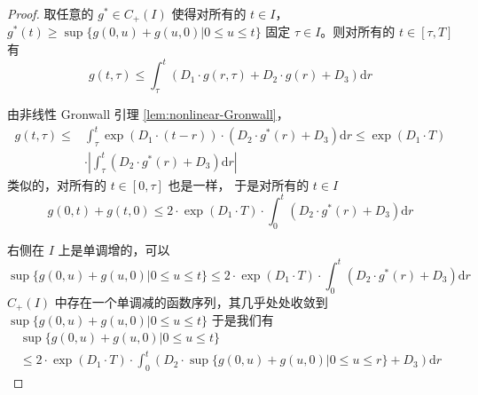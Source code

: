 \begin{proof}
  取任意的 $g^{*} \in C_{+}(I)$ 使得对所有的 $t \in I $， $g^{*}(t) \geqslant \sup \{g(0, u)+g(u, 0) | 0 \leqslant u \leqslant t\}$
 固定 $\tau \in I$。则对所有的 $t \in[\tau, T]$ 有
\[
g(t, \tau) \leqslant \int_{\tau}^{t}\left(D_{1} \cdot g(r, \tau)+D_{2} \cdot g(r)+D_{3}\right) \mathrm{d} r
\]

由非线性 Gronwall 引理 \ref{lem:nonlinear-Gronwall}，
\[
\begin{aligned}
g(t, \tau) \leqslant & \int_{\tau}^{t} \exp \left(D_{1} \cdot(t-r)\right) \cdot\left(D_{2} \cdot g^{*}(r)+D_{3}\right) \mathrm{d} r \leqslant \exp \left(D_{1} \cdot T\right) \\
& \cdot\left|\int_{\tau}^{t}\left(D_{2} \cdot g^{*}(r)+D_{3}\right) \mathrm{d} r\right|
\end{aligned}
\]
类似的，对所有的 $t \in[0, \tau] $ 也是一样， 于是对所有的 $t \in I$
\[
g(0, t)+g(t, 0) \leqslant 2 \cdot \exp \left(D_{1} \cdot T\right) \cdot \int_{0}^{t}\left(D_{2} \cdot g^{*}(r)+D_{3}\right) \mathrm{d} r
\]

右侧在 $I$ 上是单调增的，可以
\[
\sup \{g(0, u)+g(u, 0) | 0 \leqslant u \leqslant t\} \leqslant 2 \cdot \exp \left(D_{1} \cdot T\right) \cdot \int_{0}^{t}\left(D_{2} \cdot g^{*}(r)+D_{3}\right) \mathrm{d} r
\]
$C_{+}(I)$ 中存在一个单调减的函数序列，其几乎处处收敛到  $\sup \{g(0, u)+g(u, 0) | 0 \leqslant u \leqslant t\}$ 于是我们有
\[
\begin{array}{l}
\sup \{g(0, u)+g(u, 0) | 0 \leqslant u \leqslant t\} \\
\leqslant 2 \cdot \exp \left(D_{1} \cdot T\right) \cdot \int_{0}^{t}\left(D_{2} \cdot \sup \{g(0, u)+g(u, 0) | 0 \leqslant u \leqslant r\}+D_{3}\right) \mathrm{d} r
\end{array}
\]


\end{proof}
